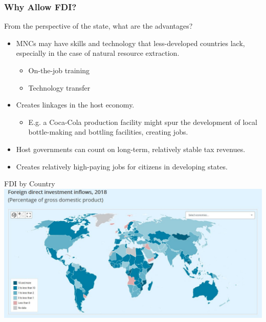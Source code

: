 \documentclass{beamer}
\begin{document}
\begin{frame} 
	\frametitle{\LARGE{Why Allow FDI?}}
	From the perspective of the state, what are the advantages?
	\begin{itemize}
		
		\item MNCs may have skills and technology that less-developed countries lack, especially in the case of natural resource extraction.  \pause 
		\begin{itemize}
			\item On-the-job training  \pause
			\item Technology transfer \pause 
		\end{itemize}
		\item Creates linkages in the host economy. \pause 
		\begin{itemize}
			\item E.g. a Coca-Cola production facility might spur the development of local bottle-making and bottling facilities, creating jobs. \pause 
		\end{itemize}
		\item Host governments can count on long-term, relatively stable tax revenues. \pause
		\item Creates relatively high-paying jobs for citizens in developing states.
		
	\end{itemize}
\end{frame}


\begin{frame}{\LARGE FDI by Country}
	\centering
	\includegraphics[width=\textwidth,height=0.8\textheight,keepaspectratio]{FDI by country.JPG}
\end{frame}
\end{document}
